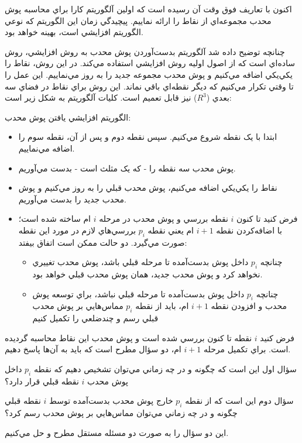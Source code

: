 \documentclass{book}
\begin{document}
اکنون با تعاريف فوق وقت آن رسيده است که اولين آلگوريتم کارا براي محاسبه پوش محدب مجموعه‌اي از نقاط را ارائه نماييم. پيچيدگي زمان اين الگوريتم که نوعي الگوريتم افزايشي است، بهينه خواهد بود.

چنانچه توضيح داده شد آلگوريتم بدست‌آوردن پوش محدب به روش افزايشي، روش ساده‌اي است که از اصول اوليه روش افزايشي استفاده مي‌کند. در اين روش، نقاط را يکي‌يکي اضافه مي‌کنيم و پوش محدب مجموعه جديد را به روز مي‌نماييم. اين عمل را تا وقتي تکرار مي‌کنيم که ديگر نقطه‌اي باقي نماند. اين روش براي نقاط در فضاي سه بعدي ($R^3$) نيز قابل تعميم است. کليات آلگوريتم به شکل زير است:

الگوريتم افزايشي يافتن پوش محدب:

\begin{itemize}
    \item
    ابتدا با يک نقطه شروع مي‌کنيم. سپس نقطه دوم و پس از آن، نقطه سوم را اضافه مي‌نماييم.
    \item
    پوش محدب سه نقطه را - که يک مثلث است - بدست مي‌آوريم.
    \item
    نقاط را يکي‌يکي اضافه مي‌کنيم، پوش محدب قبلي را به روز مي‌کنيم و پوش محدب جديد را بدست مي‌آوريم.
    \item
    فرض کنيد تا کنون $i$  نقطه بررسي و پوش محدب در مرحله $i$  ام ساخته شده است؛ با اضافه‌کردن نقطه $i+1$ ام يعني نقطه $p_i$ بررسي‌هاي لازم در مورد اين نقطه صورت مي‌گيرد. دو حالت ممکن است اتفاق بيفتد:
    \begin{itemize}
        \item
        چنانچه $p_i$ داخل پوش بدست‌آمده تا مرحله قبلي باشد، پوش محدب تغييري نخواهد کرد و پوش محدب جديد، همان پوش محدب قبلي خواهد بود.
        \item
        چنانچه $p_i$ داخل پوش بدست‌آمده تا مرحله قبلي نباشد، براي توسعه پوش محدب و افزودن نقطه    $i+1$  ام، بايد از نقطه $p_i$ مماس‌هايي بر پوش محدب قبلي رسم و چندضلعي را تکميل کنيم
    \end{itemize}
\end{itemize}

فرض کنيد $i$ نقطه تا کنون بررسي شده است و پوش محدب اين نقاط محاسبه گرديده است. براي تکميل مرحله $i+1$ ام، دو سؤال مطرح است که بايد به آن‌ها پاسخ دهيم.

سؤال اول اين است که چگونه و در چه زماني مي‌توان تشخيص دهيم كه نقطه $p_i$ داخل پوش محدب $i$ نقطه قبلي قرار دارد؟

سؤال دوم اين است که از نقطه $p_i$  خارج پوش محدب بدست‌آمده توسط $i$ نقطه قبلي چگونه و در چه زماني مي‌توان مماس‌هايي بر پوش محدب رسم كرد؟

اين دو سؤال را به صورت دو مسئله مستقل مطرح و حل مي‌کنيم.
\end{document}
